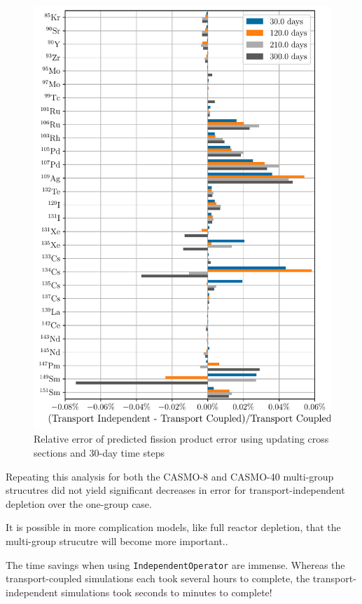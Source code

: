     \begin{figure}[htpb]
        \centering
        \includegraphics[width=\linewidth]{figs/fission_products_updating_xs_predictor_fission_q_months.pdf}
        \caption{Relative error of predicted fission product error using
        updating cross sections and 30-day time steps}
        \label{fig:fp-error-updating-xs-months}
    \end{figure}


    Repeating this analysis for both the CASMO-8 and CASMO-40 multi-group
    strucutres did not yield significant decreases in error for
    transport-independent depletion over the one-group case.

    It is possible in
    more complication models, like full reactor depletion, that the multi-group
    strucutre will become more important..

    The time savings when using \verb.IndependentOperator. are immense. Whereas
    the transport-coupled simulations each took several hours to complete, the
    transport-independent simulations took seconds to minutes to complete!



